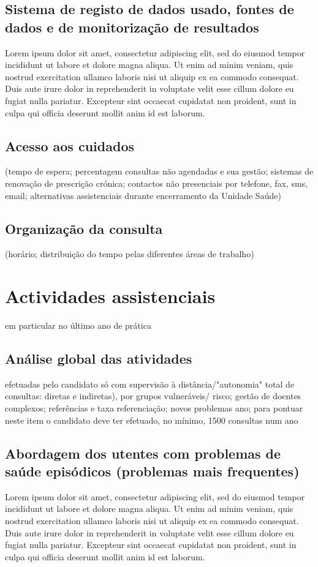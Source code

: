 \documentclass{report}
\begin{document}
\subsection{Sistema de registo de dados usado, fontes de dados e de monitorização de resultados}
Lorem ipsum dolor sit amet, consectetur adipiscing elit, sed do eiusmod tempor incididunt ut labore et dolore magna aliqua. Ut enim ad minim veniam, quis nostrud exercitation ullamco laboris nisi ut aliquip ex ea commodo consequat. Duis aute irure dolor in reprehenderit in voluptate velit esse cillum dolore eu fugiat nulla pariatur. Excepteur sint occaecat cupidatat non proident, sunt in culpa qui officia deserunt mollit anim id est laborum.
\subsection{Acesso aos cuidados}
(tempo de espera; percentagem consultas não agendadas e sua gestão; sistemas de renovação de prescrição crónica; contactos não presenciais por telefone, fax, sms, email; alternativas assistenciais durante encerramento da Unidade Saúde)
\subsection{Organização da consulta}
(horário; distribuição do tempo pelas diferentes áreas de trabalho)

\section{Actividades assistenciais}
em particular no último ano de prática

\subsection{Análise global das atividades}
efetuadas pelo candidato só com supervisão à distância/"autonomia" total de consultas: diretas e indiretas), por grupos vulneráveis/ risco; gestão de doentes complexos; referências e taxa referenciação; novos problemas ano; para pontuar neste item o candidato deve ter efetuado, no mínimo, 1500 consultas num ano
\subsection{Abordagem dos utentes com problemas de saúde episódicos (problemas mais frequentes)}
Lorem ipsum dolor sit amet, consectetur adipiscing elit, sed do eiusmod tempor incididunt ut labore et dolore magna aliqua. Ut enim ad minim veniam, quis nostrud exercitation ullamco laboris nisi ut aliquip ex ea commodo consequat. Duis aute irure dolor in reprehenderit in voluptate velit esse cillum dolore eu fugiat nulla pariatur. Excepteur sint occaecat cupidatat non proident, sunt in culpa qui officia deserunt mollit anim id est laborum.
\end{document}
